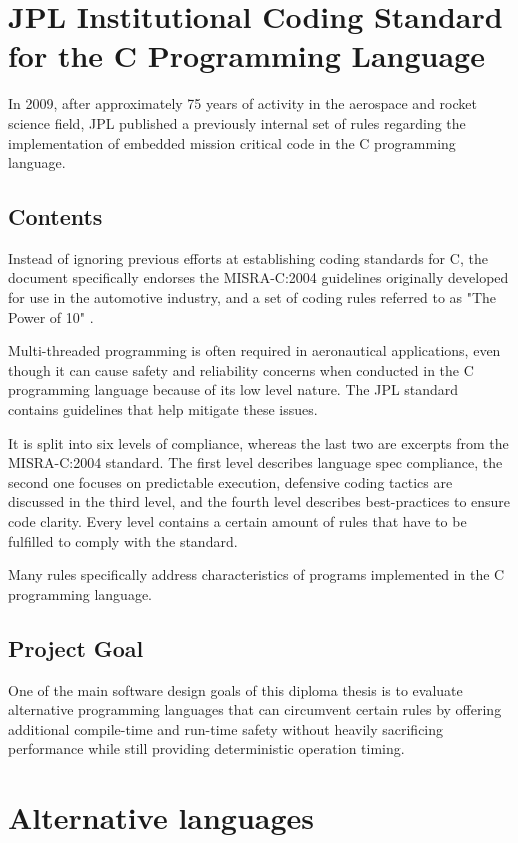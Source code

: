 \section{JPL Institutional Coding Standard for the C Programming Language}
\author{Philip Trauner}

In 2009, after approximately 75 years of activity in the aerospace and rocket science field, JPL published a previously internal set of rules regarding the implementation of embedded mission critical code in the C programming language. \cite{jpl-coding-standard}

\subsection{Contents}
Instead of ignoring previous efforts at establishing coding standards for C, the document specifically endorses the MISRA-C:2004 \cite{misra-c} guidelines originally developed for use in the automotive industry, and a set of coding rules referred to as "The Power of 10" \cite{power-of-ten}. 

Multi-threaded programming is often required in aeronautical applications, even though it can cause safety and reliability concerns when conducted in the C programming language because of its low level nature. The JPL standard contains guidelines that help mitigate these issues.

It is split into six levels of compliance, whereas the last two are excerpts from the MISRA-C:2004 standard. The first level describes language spec compliance, the second one focuses on predictable execution, defensive coding tactics are discussed in the third level, and the fourth level describes best-practices to ensure code clarity. Every level contains a certain amount of rules that have to be fulfilled to comply with the standard.

Many rules specifically address characteristics of programs implemented in the C programming language.

\subsection{Project Goal}
One of the main software design goals of this diploma thesis is to evaluate alternative programming languages that can circumvent certain rules by offering additional compile-time and run-time safety without heavily sacrificing performance while still providing deterministic operation timing.

\section{Alternative languages}
